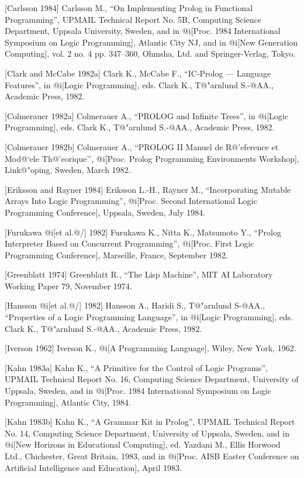 {[Carlsson 1984] Carlsson M.,
``On Implementing Prolog in Functional Programming'',
UPMAIL Technical Report No. 5B,
Computing Science Department, Uppsala University, Sweden, and in 
@i[Proc. 1984 International Symposium on Logic Programming],
Atlantic City NJ, and in
@i[New Generation Computing], vol. 2 no. 4 pp. 347--360,
Ohmsha, Ltd. and Springer-Verlag, Tokyo.

[Clark and McCabe 1982a] Clark K., McCabe F.,
``IC-Prolog --- Language Features'', in 
@i[Logic Programming], eds. Clark K., T@"arnlund S.-@AA., Academic Press, 
1982.

[Colmerauer 1982a] Colmerauer A.,
``PROLOG and Infinite Trees'', in 
@i[Logic Programming], eds. Clark K., T@"arnlund S.-@AA., Academic Press, 
1982.

[Colmerauer 1982b] Colmerauer A.,
``PROLOG II Manuel de R@'eference et Mod@`ele Th@'eorique'',
@i[Proc. Prolog Programming Environments Workshop], 
Link@"oping, Sweden, March 1982.

[Eriksson and Rayner 1984] Eriksson L.-H., Rayner M.,
``Incorporating Mutable Arrays Into Logic Programming'',
@i[Proc. Second International Logic Programming Conference],
Uppsala, Sweden, July 1984.

[Furukawa @i[et al.@/] 1982] Furukawa K., Nitta K., Matsumoto Y.,
``Prolog Interpreter Based on Concurrent Programming'',
@i[Proc. First Logic Programming Conference], 
Marseille, France, September 1982.

[Greenblatt 1974] Greenblatt R.,
``The Lisp Machine'',
MIT AI Laboratory Working Paper 79, November 1974.

[Hansson @i[et al.@/] 1982] Hansson A., Haridi S., T@"arnlund S-@AA.,
``Properties of a Logic Programming Language'', in 
@i[Logic Programming], eds. Clark K., T@"arnlund S.-@AA., Academic Press, 
1982.

[Iverson 1962] Iverson K., @i[A Programming Language], Wiley, New York, 1962.

[Kahn 1983a] Kahn K.,
``A Primitive for the Control of Logic Programs'',
UPMAIL Technical Report No. 16, Computing Science Department,
University of Uppsala, Sweden, and in
@i[Proc. 1984 International Symposium on Logic Programming],
Atlantic City, 1984.

[Kahn 1983b] Kahn K.,
``A Grammar Kit in Prolog'',
UPMAIL Technical Report No. 14, Computing Science Department,
University of Uppsala, Sweden, and in 
@i[New Horizons in Educational Computing],
ed. Yazdani M., Ellis Horwood Ltd., Chichester, Great Britain, 1983,
and in
@i[Proc. AISB Easter Conference on Artificial Intelligence and Education],
April 1983.

}
